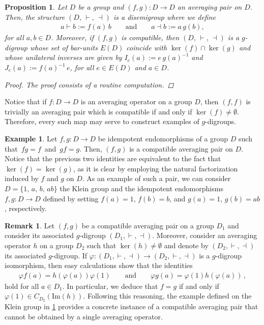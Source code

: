 \documentclass[preprint,1p]{elsarticle}
\numberwithin{equation}{section}
\newtheorem{prop}[theor]{Proposition}
\theoremstyle{definition}               %
\newtheorem{ex}[theor]{Example}
\newtheorem{rem}[theor]{Remark}
\newcommand{\vd}{\vdash}
\newcommand{\dv}{\dashv}
\begin{document}
\begin{prop}\label{ex_KU}
Let $D$ be a group and $(f,g):D\to D$ an averaging pair on $D$. Then, the structure $\left(D,\,\vd,\,\dv\right)$ is a disemigroup where we define
\begin{align*}
    a \vd b:= f(a)\, b
    \qquad\text{and}\qquad
    a \dv b:= a\, g(b),
\end{align*}
for all $a,b \in D$. Moreover, if $\left(f,g\right)$ is compatible, then $\left(D,\,\vd,\,\dv\right)$ is a $g$-digroup whose set of bar-units $E(D)$ coincide with $\ker(f) \cap \ker(g)$ and whose unilateral inverses are given by $I_e(a):= e\,g(a)^{-1}$ and $J_e(a):= f(a)^{-1}\,e$, for all $e \in E(D)$ and $a \in D$.
\begin{proof}
    The proof consists of a routine computation.
\end{proof}
\end{prop}

Notice that if $f:D \to D$ is an averaging operator on a group $D$, then $(f,f)$ is trivially an averaging pair which is compatible if and only if $\ker(f) \neq \emptyset$.
Therefore, every such map may serve to construct examples of $g$-digroups.

\begin{ex}\label{ex-Kl}
    Let $f,g:D \to D$ be idempotent endomorphisms of a group $D$ such that\ $fg = f$\ and\ $gf = g$.
    Then, $(f,g)$ is a compatible averaging pair on $D$.
    Notice that the previous two identities are equivalent to the fact that $\ker(f) = \ker(g)$, as it is clear by employing the natural factorization induced by $f$ and $g$ on $D$.
    As an example of such a pair, we can consider $D =\{1,\, a,\, b,\, ab\}$ the Klein group and the idempotent endomorphisms $f,g:D\to D$ defined by setting $f\left(a\right) = 1$, $f\left(b\right) = b$, and $g\left(a\right) = 1$, $g\left(b\right) = ab$, respectively. 
\end{ex}

\begin{rem}\label{rem-isom-g-dgroups}
    Let $(f,g)$ be a compatible averaging pair on a group $D_1$ and consider its associated $g$-digroup $(D_1,\vd,\dv)$.
    Moreover, consider an averaging operator $h$ on a group $D_2$ such that $\ker(h) \neq \emptyset$ and denote by $(D_2,\vd,\dv)$ its associated $g$-digroup.
    If $\varphi:(D_1,\vd,\dv) \to (D_2,\vd,\dv)$ is a $g$-digroup isomorphism, then easy calculations show that the identities
    \begin{align*}
        \varphi f(a) = h(\varphi(a)) \varphi(1)
        \qquad\text{and}\qquad
        \varphi g(a) = \varphi(1) h(\varphi(a)) \,,
    \end{align*}
    hold for all $a \in D_1$.
    In particular, we deduce that $f=g$ if and only if $\varphi\left(1\right)\in C_{D_2}\left(\text{Im}(h)\right)$.
    Following this reasoning, the example defined on the Klein group in \cref{ex-Kl} provides a concrete instance of a compatible averaging pair that cannot be obtained by a single averaging operator. 
\end{rem}
\end{document}
